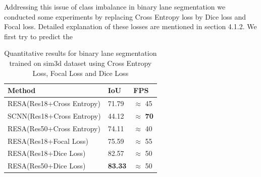     Addressing this issue of class imbalance in binary lane segmentation we conducted some experiments by replacing Cross Entropy loss by Dice loss and Focal loss. Detailed explanation of these losses are mentioned in section 4.1.2. We first try to predict the 
    
     \begin{table}[h!]
    \caption{Quantitative results for binary lane segmentation trained on sim3d \cite{} dataset using Cross Entropy Loss, Focal Loss and Dice Loss}
    \centering
    \begin{tabular}{|l|l|l|}
    \hline
        \textbf{Method} & \textbf{IoU} & \textbf{FPS} \\ \hline
        RESA(Res18+Cross Entropy) & 71.79 & $\approx$ 45 \\ \hline
        SCNN(Res18+Cross Entropy) & 44.12 & $\approx$ \textbf{70}  \\ \hline
        RESA(Res50+Cross Entropy) & 74.11 & $\approx$ 40  \\ \hline
        RESA(Res18+Focal Loss) & 75.59 & $\approx$ 55 \\\hline
        RESA(Res18+Dice Loss) & 82.57 & $\approx$ 50 \\\hline
        RESA(Res50+Dice Loss) & \textbf{83.33} & $\approx$ 50 \\\hline
    \end{tabular}
\end{table}
    
